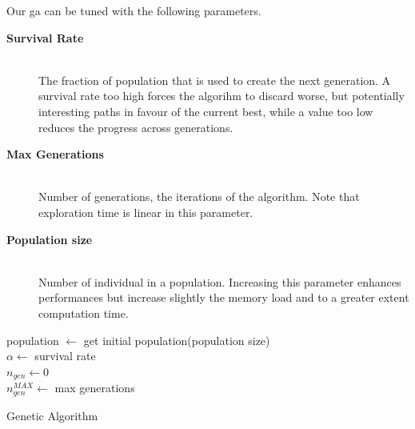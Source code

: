 \documentclass[12pt,journal,draftclsnofoot,onecolumn]{IEEEtran}
\DeclarePairedDelimiter\floor{\lfloor}{\rfloor}
\begin{document}
Our \gls{ga} can be tuned with the following parameters.
\begin{description}
	\item[\textbf{Survival Rate}] \hfill \\
	The fraction of population that is used to create the next generation. A survival rate too high forces the algorihm to discard worse, but potentially interesting paths in favour of the current best, while a value too low reduces the progress across generations.
	\item[\textbf{Max Generations}] \hfill \\
	Number of generations, the iterations of the algorithm. Note that exploration time is linear in this parameter.
	\item[\textbf{Population size}] \hfill \\
	Number of individual in a population. Increasing this parameter enhances performances but increase slightly the memory load and to a greater extent computation time.
\end{description}


\begin{algorithm}
	population $\gets$ get initial population(population size) \\
	$\alpha \gets$ survival rate \\
	$n_{gen} \gets 0$ \\
	$n_{gen}^{MAX} \gets$ max generations \\
	\caption{Genetic Algorithm}\label{algo:GA}
\end{algorithm}
\end{document}

